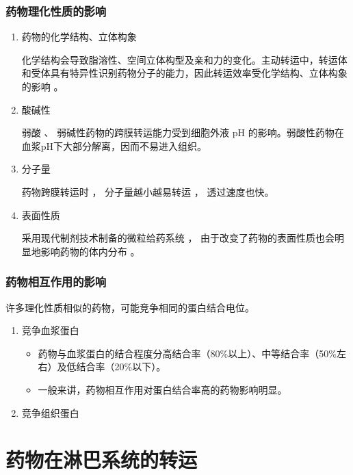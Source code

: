 \documentclass[dvipsnames, svgnames, x11names]{beamer}
\begin{document}
\begin{frame}
    \frametitle{药物理化性质的影响}
\begin{enumerate}
  \item 药物的化学结构、立体构象
  
  化学结构会导致脂溶性、空间立体构型及亲和力的变化。主动转运中，转运体和受体具有特异性识别药物分子的能力，因此转运效率受化学结构、立体构象的影响 。
  \item 酸碱性
  
  弱酸 、 弱碱性药物的跨膜转运能力受到细胞外液 pH 的影响。弱酸性药物在血浆pH下大部分解离，因而不易进入组织。
  \item 分子量
  
  药物跨膜转运时 ， 分子量越小越易转运 ， 透过速度也快。
  
  \item 表面性质
  
  采用现代制剂技术制备的微粒给药系统 ， 由于改变了药物的表面性质也会明显地影响药物的体内分布 。 
\end{enumerate}
\end{frame}


\begin{frame}
    \frametitle{药物相互作用的影响}
    许多理化性质相似的药物，可能竞争相同的蛋白结合电位。
    \begin{enumerate}
      \item 竞争血浆蛋白
      
      \begin{itemize}
        \item 药物与血浆蛋白的结合程度分高结合率（80\%以上）、中等结合率（50\%左右）及低结合率（20\%以下）。
        \item 一般来讲，药物相互作用对蛋白结合率高的药物影响明显。
      \end{itemize}
      \item 竞争组织蛋白
    \end{enumerate}
\end{frame}

\section{药物在淋巴系统的转运}
\end{document}

